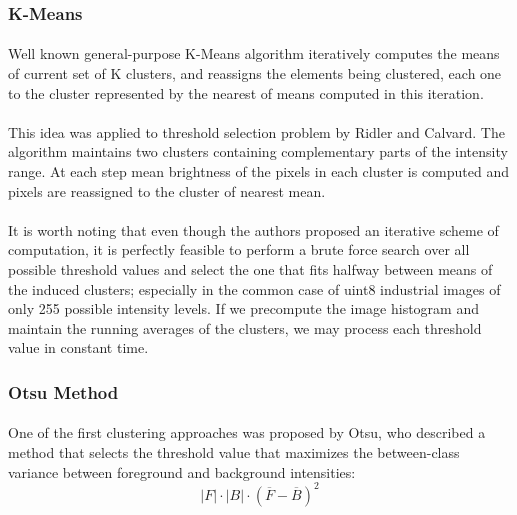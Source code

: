 \subsubsection{K-Means}

\paragraph*{}
Well known general-purpose K-Means algorithm iteratively computes the means of current set of K clusters, and reassigns the elements being clustered, each one to the cluster represented by the nearest of means computed in this iteration. 

\paragraph*{}
This idea was applied\cite{RidlerCalvard78} to threshold selection problem by Ridler and Calvard. The algorithm maintains two clusters containing complementary parts of the intensity range. At each step mean brightness of the pixels in each cluster is computed and pixels are reassigned to the cluster of nearest mean.

\paragraph*{}
It is worth noting that even though the authors proposed an iterative scheme of computation, it is perfectly feasible to perform a brute force search over all possible threshold values and select the one that fits halfway between means of the induced clusters; especially in the common case of uint8 industrial images of only 255 possible intensity levels. If we precompute the image histogram and maintain the running averages of the clusters, we may process each threshold value in constant time.

\subsubsection{Otsu Method}

\paragraph*{}
One of the first clustering approaches was proposed\cite{Otsu79} by Otsu, who described a method that selects the threshold value that maximizes the between-class variance between foreground and background intensities:
\[
	|F| \cdot |B| \cdot (\overline{F} - \overline{B})^2
\]

